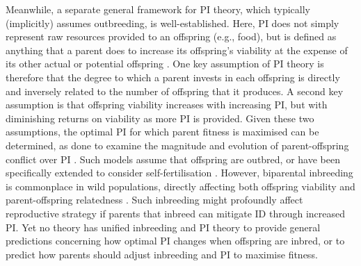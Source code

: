 \documentclass[10pt,letterpaper]{article}
\begin{document}
Meanwhile, a separate general framework for PI theory, which typically (implicitly) assumes outbreeding, is well-established. Here, PI does not simply represent raw resources provided to an offspring (e.g., food), but is defined as anything that a parent does to increase its offspring's viability at the expense of its other actual or potential offspring \cite[][]{Trivers1972, Trivers1974}. One key assumption of PI theory is therefore that the degree to which a parent invests in each offspring is directly and inversely related to the number of offspring that it produces. A second key assumption is that offspring viability increases with increasing PI, but with diminishing returns on viability as more PI is provided. Given these two assumptions, the optimal PI for which parent fitness is maximised can be determined, as done to examine the magnitude and evolution of parent-offspring conflict over PI \cite[][]{Macnair1978, Parker1978, Parker1985, DeJong2005, Kuijper2012}. Such models assume that offspring are outbred, or have been specifically extended to consider self-fertilisation \cite[][]{DeJong2005}. However, biparental inbreeding is commonplace in wild populations, directly affecting both offspring viability and parent-offspring relatedness \cite[][]{Trivers1974, Lynch1998, OGrady2006, Charlesworth2009, Reid2016}. Such inbreeding might profoundly affect reproductive strategy if parents that inbreed can mitigate ID through increased PI. Yet no theory has unified inbreeding and PI theory to provide general predictions concerning how optimal PI changes when offspring are inbred, or to predict how parents should adjust inbreeding and PI to maximise fitness. 
\end{document}
